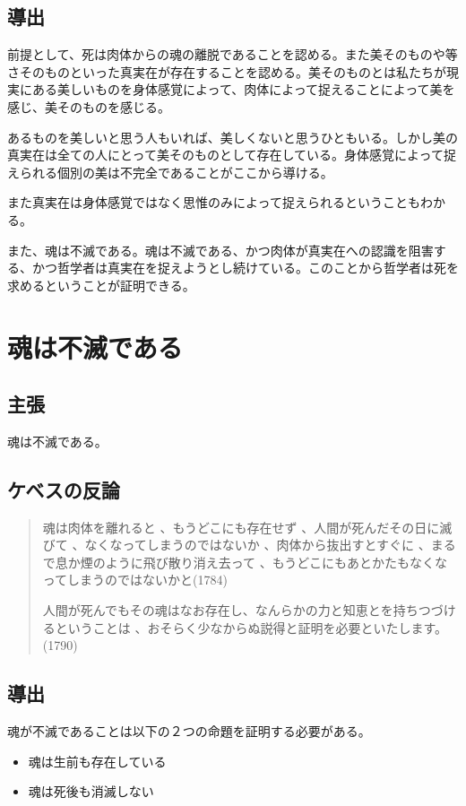 \documentclass[a4j,11pt]{jarticle}
\begin{document}
\subsection{導出}
前提として、死は肉体からの魂の離脱であることを認める。また美そのものや等さそのものといった真実在が存在することを認める。美そのものとは私たちが現実にある美しいものを身体感覚によって、肉体によって捉えることによって美を感じ、美そのものを感じる。

あるものを美しいと思う人もいれば、美しくないと思うひともいる。しかし美の真実在は全ての人にとって美そのものとして存在している。身体感覚によって捉えられる個別の美は不完全であることがここから導ける。

また真実在は身体感覚ではなく思惟のみによって捉えられるということもわかる。

また、魂は不滅である。魂は不滅である、かつ肉体が真実在への認識を阻害する、かつ哲学者は真実在を捉えようとし続けている。このことから哲学者は死を求めるということが証明できる。

\section{魂は不滅である}

\subsection{主張}
魂は不滅である。

\subsection{ケベスの反論}
\begin{quotation}
    魂は肉体を離れると 、もうどこにも存在せず 、人間が死んだその日に滅びて 、なくなってしまうのではないか 、肉体から抜出すとすぐに 、まるで息か煙のように飛び散り消え去って 、もうどこにもあとかたもなくなってしまうのではないかと(1784)
    
    人間が死んでもその魂はなお存在し、なんらかの力と知恵とを持ちつづけるということは 、おそらく少なからぬ説得と証明を必要といたします。(1790)
\end{quotation}

\subsection{導出}
魂が不滅であることは以下の２つの命題を証明する必要がある。

\begin{itemize}    
    \item 魂は生前も存在している
    \item 魂は死後も消滅しない
\end{itemize}
\end{document}
